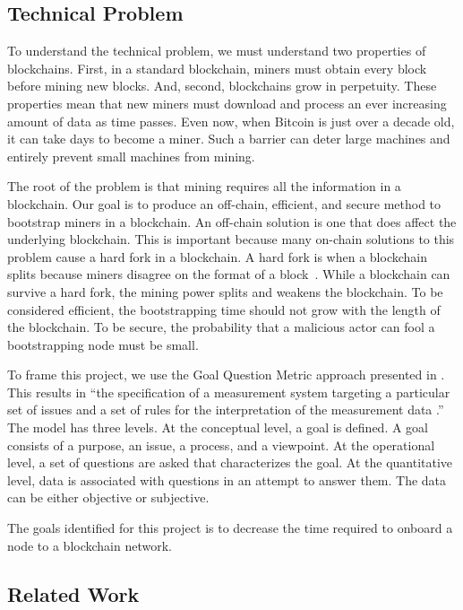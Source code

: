 \subsection{Technical Problem}

To understand the technical problem, we must understand two properties of blockchains.
First, in a standard blockchain, miners must obtain every block before mining new blocks.
And, second, blockchains grow in perpetuity.
These properties mean that new miners must download and process an ever increasing amount of data as time passes.
Even now, when Bitcoin is just over a decade old, it can take days to become a miner. %
Such a barrier can deter large machines and entirely prevent small machines from mining.

The root of the problem is that mining requires all the information in a blockchain.
Our goal is to produce an off-chain, efficient, and secure method to bootstrap miners in a blockchain.
An off-chain solution is one that does affect the underlying blockchain.
This is important because many on-chain solutions to this problem cause a hard fork in a blockchain.
A hard fork is when a blockchain splits because miners disagree on the format of a block~\cite{lin2017Survey}.
While a blockchain can survive a hard fork, the mining power splits and weakens the blockchain.
To be considered efficient, the bootstrapping time should not grow with the length of the blockchain.
To be secure, the probability that a malicious actor can fool a bootstrapping node must be small.

To frame this project, we use the Goal Question Metric approach presented in \cite{basili1994goal}.
This results in ``the specification of a measurement system targeting a particular set of issues and a set of rules for the interpretation of the measurement data \cite{basili1994goal}.''
The model has three levels.
At the conceptual level, a goal is defined.
A goal consists of a purpose, an issue, a process, and a viewpoint.
At the operational level, a set of questions are asked that characterizes the goal.
At the quantitative level, data is associated with questions in an attempt to answer them.
The data can be either objective or subjective.

The goals identified for this project is to decrease the time required to onboard a node to a blockchain network.



\subsection{Related Work}


